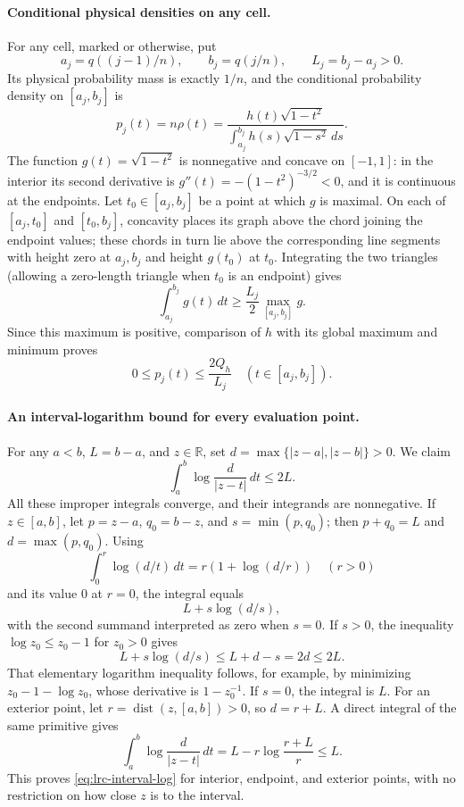 \paragraph{Conditional physical densities on any cell.}
For any cell, marked or otherwise, put
\[
 a_j=q((j-1)/n),\qquad b_j=q(j/n),\qquad L_j=b_j-a_j>0.
\]
Its physical probability mass is exactly $1/n$, and the conditional
probability density on $[a_j,b_j]$ is
\[
 p_j(t)=n\rho(t)
       =\frac{h(t)\sqrt{1-t^2}}
               {\int_{a_j}^{b_j}h(s)\sqrt{1-s^2}\,ds}.
\]
The function $g(t)=\sqrt{1-t^2}$ is nonnegative and concave on
$[-1,1]$: in the interior its second derivative is
$g''(t)=-(1-t^2)^{-3/2}<0$, and it is continuous at the endpoints.
Let $t_0\in[a_j,b_j]$ be a point at which $g$ is maximal.
On each of $[a_j,t_0]$ and $[t_0,b_j]$, concavity places its graph
above the chord joining the endpoint values; these chords in turn
lie above the corresponding line segments with height zero at
$a_j,b_j$ and height $g(t_0)$ at $t_0$. Integrating the two triangles
(allowing a zero-length triangle when $t_0$ is an endpoint) gives
\[
 \int_{a_j}^{b_j}g(t)\,dt\geq\frac{L_j}2\max_{[a_j,b_j]}g.
\]
Since this maximum is positive, comparison of $h$ with its global
maximum and minimum proves
\begin{equation}\label{eq:lrc-cell-density}
 0\leq p_j(t)\leq\frac{2Q_h}{L_j}
 \quad(t\in[a_j,b_j]).
\end{equation}

\paragraph{An interval-logarithm bound for every evaluation point.}
For any $a<b$, $L=b-a$, and $z\in\mathbb R$, set
$d=\max\{|z-a|,|z-b|\}>0$. We claim
\begin{equation}\label{eq:lrc-interval-log}
 \int_a^b\log\frac d{|z-t|}\,dt\leq2L.
\end{equation}
All these improper integrals converge, and their integrands are
nonnegative. If $z\in[a,b]$, let $p=z-a$, $q_0=b-z$, and
$s=\min(p,q_0)$; then $p+q_0=L$ and $d=\max(p,q_0)$.
Using
\[
 \int_0^r\log(d/t)\,dt=r(1+\log(d/r))\quad(r>0)
\]
and its value $0$ at $r=0$, the integral equals
\[
 L+s\log(d/s),
\]
with the second summand interpreted as zero when $s=0$.
If $s>0$, the inequality $\log z_0\leq z_0-1$ for $z_0>0$ gives
\[
 L+s\log(d/s)\leq L+d-s=2d\leq2L.
\]
That elementary logarithm inequality follows, for example, by
minimizing $z_0-1-\log z_0$, whose derivative is $1-z_0^{-1}$.
If $s=0$, the integral is $L$. For an exterior point, let
$r=\operatorname{dist}(z,[a,b])>0$, so $d=r+L$. A direct integral
of the same primitive gives
\[
 \int_a^b\log\frac d{|z-t|}\,dt
 =L-r\log\frac{r+L}{r}\leq L.
\]
This proves \eqref{eq:lrc-interval-log} for interior, endpoint, and
exterior points, with no restriction on how close $z$ is to the
interval.

